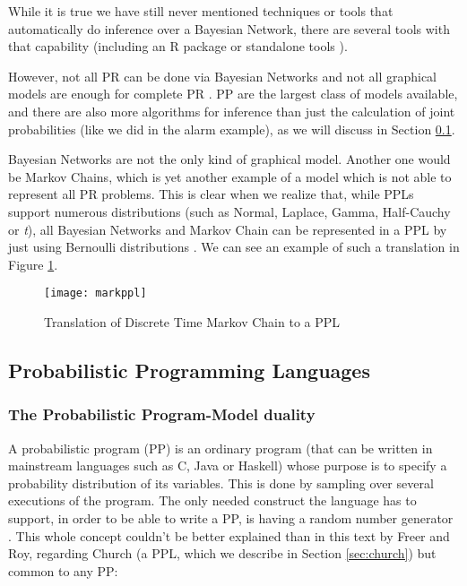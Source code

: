 While it is true we have still never mentioned techniques or tools that
automatically do inference over a Bayesian Network, there are several tools
with that capability (including an R package \cite{Hojsgaard2013} or
standalone tools \cite{msbn}).

However, not all PR can be done via Bayesian Networks and not all graphical models
are enough for complete PR \cite{intpp}. PP are the largest class of models available, and there are
also more algorithms for inference than just the calculation of joint
probabilities (like we did in the alarm example), as we will discuss in Section
\ref{sec:pp}.

Bayesian Networks are not the only kind of graphical model. Another one would be
Markov Chains, which is yet another example of a model which is not able to
represent all PR problems. This is clear when we realize that, while PPLs
support numerous distributions (such as Normal, Laplace,
Gamma, Half-Cauchy or \textit{t}), all Bayesian Networks and Markov Chain
can be represented in a PPL by just using Bernoulli distributions \cite{PPm}.
We can see an example of such a translation in Figure \ref{fig:mppl}.

\begin{figure}[t]
  \begin{center}
    \leavevmode
    \texttt{[image: markppl]}
    \caption{Translation of Discrete Time Markov Chain to a PPL \cite{PPm}}
    \label{fig:mppl}
  \end{center}
\end{figure}


\subsection{Probabilistic Programming Languages}
\label{sec:pp}

\subsubsection{The Probabilistic Program-Model duality}

A probabilistic program (PP) is an ordinary program (that can be written in
mainstream languages such as C, Java or Haskell) whose purpose is to specify
a probability distribution of its variables. This is done by sampling over
several executions of the program. The only needed construct the language
has to support, in order to be able to write a PP, is having a random number
generator \cite{intpp}. This whole concept couldn't be better explained than in this text by Freer and
Roy, regarding Church (a PPL, which we describe in Section \ref{sec:church})
but common to any PP:

